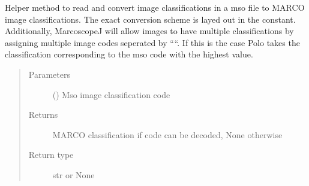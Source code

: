 \documentclass[letterpaper,10pt,english]{sphinxmanual}
\begin{document}
\begin{fulllineitems}

\begin{fulllineitems}
\label{\detokenize{polo.utils:polo.utils.io_utils.MsoReader.read_mso_classification}}
Helper method to read and convert image classifications in a mso
file to MARCO image classifications. The exact conversion scheme is
layed out in the  constant.
Additionally, MarcoscopeJ will allow
images to have multiple classifications by assigning multiple
image codes seperated by “\sphinxhyphen{}“. If this is the case Polo takes the
classification corresponding to the mso code with the highest value.
\begin{quote}\begin{description}
\item[{Parameters}] \leavevmode
{} () \textendash{} Mso image classification code

\item[{Returns}] \leavevmode
MARCO classification if code can be decoded, None otherwise

\item[{Return type}] \leavevmode
str or None

\end{description}\end{quote}

\end{fulllineitems}


\end{fulllineitems}

\end{document}

